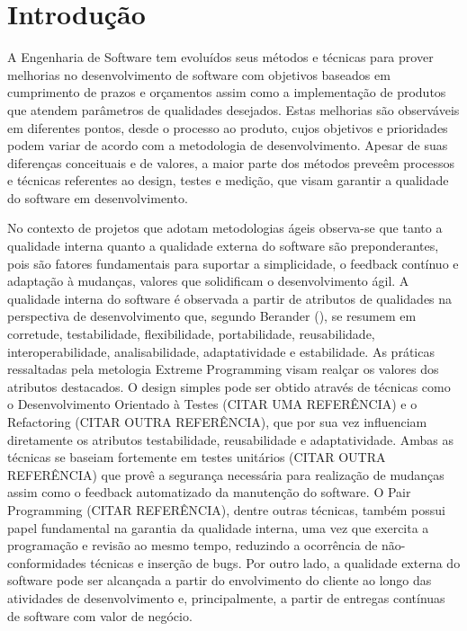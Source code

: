 \chapter{Introdução}
\label{cap-introducao}

A Engenharia de Software tem evoluídos seus métodos e técnicas para prover melhorias no desenvolvimento de software com objetivos baseados em cumprimento de prazos e orçamentos assim como a implementação de produtos que atendem parâmetros de qualidades desejados. Estas melhorias são observáveis em diferentes pontos, desde o processo ao produto, cujos objetivos e prioridades podem variar de acordo com a metodologia de desenvolvimento. Apesar de suas diferenças conceituais e de valores, a maior parte dos métodos preveêm processos e técnicas referentes ao design, testes e medição, que visam garantir a qualidade do software em desenvolvimento.

%

No contexto de projetos que adotam metodologias ágeis observa-se que tanto a qualidade interna quanto a qualidade externa do software são preponderantes, pois são fatores fundamentais para suportar a simplicidade, o feedback contínuo e adaptação à mudanças, valores que solidificam o desenvolvimento ágil. A qualidade interna do software é observada a partir de atributos de qualidades na perspectiva de desenvolvimento que, segundo Berander (\citeyear{berander2005}), se resumem em corretude, testabilidade, flexibilidade, portabilidade, reusabilidade, interoperabilidade, analisabilidade, adaptatividade e estabilidade. As práticas ressaltadas pela metologia Extreme Programming \cite{beck2000} visam realçar os valores dos atributos destacados. O design simples pode ser obtido através de técnicas como o Desenvolvimento Orientado à Testes (CITAR UMA REFERÊNCIA) e o Refactoring (CITAR OUTRA REFERÊNCIA), que por sua vez influenciam diretamente os atributos testabilidade, reusabilidade e adaptatividade. Ambas as técnicas se baseiam fortemente em testes unitários (CITAR OUTRA REFERÊNCIA) que provê a segurança necessária para realização de mudanças assim como o feedback automatizado da manutenção do software. O Pair Programming (CITAR REFERÊNCIA), dentre outras técnicas, também possui papel fundamental na garantia da qualidade interna, uma vez que exercita a programação e revisão ao mesmo tempo, reduzindo a ocorrência de não-conformidades técnicas e inserção de bugs. Por outro lado, a qualidade externa do software pode ser alcançada a partir do envolvimento do cliente ao longo das atividades de desenvolvimento e, principalmente, a partir de entregas contínuas de software com valor de negócio.

